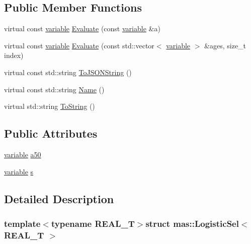 \subsection*{Public Member Functions}
\begin{DoxyCompactItemize}
\item 
virtual const \hyperlink{structmas_1_1_logistic_sel_afd5ce39e0aaab3c2bbe4cdab00f0273e}{variable} \hyperlink{structmas_1_1_logistic_sel_a2e7590748bd817f5a019c633213488cc}{Evaluate} (const \hyperlink{structmas_1_1_logistic_sel_afd5ce39e0aaab3c2bbe4cdab00f0273e}{variable} \&a)
\item 
virtual const \hyperlink{structmas_1_1_logistic_sel_afd5ce39e0aaab3c2bbe4cdab00f0273e}{variable} \hyperlink{structmas_1_1_logistic_sel_ae646dfffa37e9202381fb0c1879016ee}{Evaluate} (const std\-::vector$<$ \hyperlink{structmas_1_1_logistic_sel_afd5ce39e0aaab3c2bbe4cdab00f0273e}{variable} $>$ \&ages, size\-\_\-t index)
\item 
virtual const std\-::string \hyperlink{structmas_1_1_logistic_sel_afa9abd8671cf8d82a6973c4369741b41}{To\-J\-S\-O\-N\-String} ()
\item 
virtual const std\-::string \hyperlink{structmas_1_1_logistic_sel_a58f669fc791e7e86ef70820dbbed35ba}{Name} ()
\item 
virtual std\-::string \hyperlink{structmas_1_1_logistic_sel_a625cc43faa89094c25da029a827ba638}{To\-String} ()
\end{DoxyCompactItemize}
\subsection*{Public Attributes}
\begin{DoxyCompactItemize}
\item 
\hyperlink{structmas_1_1_logistic_sel_afd5ce39e0aaab3c2bbe4cdab00f0273e}{variable} \hyperlink{structmas_1_1_logistic_sel_a2aab2cd35ed2fa7fb0780c810fefb91a}{a50}
\item 
\hyperlink{structmas_1_1_logistic_sel_afd5ce39e0aaab3c2bbe4cdab00f0273e}{variable} \hyperlink{structmas_1_1_logistic_sel_a2358849095acf217deae4f595b670d2f}{s}
\end{DoxyCompactItemize}


\subsection{Detailed Description}
\subsubsection*{template$<$typename R\-E\-A\-L\-\_\-\-T$>$struct mas\-::\-Logistic\-Sel$<$ R\-E\-A\-L\-\_\-\-T $>$}



